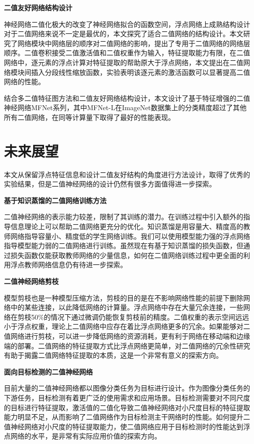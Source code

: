 \textbf{二值友好网络结构设计}

神经网络二值化极大的改变了神经网络拟合的函数空间，浮点网络上成熟结构设计对于二值网络来说不一定是最优的，本文探究了适合二值网络的结构设计。本文研究了网络模块中网络层的顺序对二值网络的影响，提出了专用于二值网络的网络层顺序。二值卷积接受二值激活值和二值权重作为输入，特征提取能力有限，在二值网络中，逐元素的浮点计算对特征提取的帮助原大于浮点网络，本文提出在二值网络模块间插入分段线性缩放函数，实验表明该逐元素的激活函数可以显著提高二值网络的性能。

结合多二值特征图方法和二值友好网络结构设计，本文设计了基于特征增强的二值神经网络MFNet系列，其中MFNet-L在ImageNet数据集上的分类精度超过了其他所有二值网络，在同等计算量下取得了最好的性能表现。

\section{未来展望}

本文从保留浮点特征信息和设计二值友好结构的角度进行方法设计，取得了优秀的实验结果，但是二值神经网络的设计仍然有很多方面值得进一步探索。

\textbf{基于知识蒸馏的二值网络训练方法}

二值神经网络的表示能力较差，限制了其训练的潜力。在训练过程中引入额外的指导信息理论上可以帮助二值网络更充分的优化。知识蒸馏是用容量大、精度高的教师网络指导容量小、精度低的学生网络训练。我们可以使用模型能力强的浮点网络指导模型能力弱的二值网络进行训练。虽然现在有基于知识蒸馏的损失函数，但通过损失函数仅能获取教师网络的少量信息，如何在二值网络训练过程中更全面的利用浮点教师网络信息仍有待进一步探索。

\textbf{二值神经网络剪枝}

模型剪枝也是一种模型压缩方法，剪枝的目的是在不影响网络性能的前提下删除网络中的某些连接，以此降低网络的计算量。浮点网络中存在大量冗余连接，一些网络在剪枝50\%的情况下通过微调仍能恢复剪枝前的精度。二值权重的表示空间远远小于浮点权重，理论上二值网络中应存在着比浮点网络更多的冗余。如果能够对二值网络进行剪枝，可以进一步降低网络的资源消耗，更有利于网络在移动端和边缘端的部署。二值网络的特征提取方式比浮点网络更简单，对二值网络的冗余性研究有助于揭露二值网络特征提取的本质，这是一个非常有意义的探索方向。

\textbf{面向目标检测的二值神经网络}

目前大量的二值神经网络都以图像分类任务为目标进行设计。作为图像分类任务的下游任务，目标检测有着更广泛的使用需求和应用场景。目标检测需要对不同尺度的目标进行特征提取，激活值的二值化导致二值神经网络对小尺度目标的特征提取能力明显不足，从而影响了二值网络作为目标检测主干网络时的性能。如何提升二值神经网络对小尺度的特征提取能力，使二值网络应用于目标检测时的性能达到浮点网络的水平，是非常有实际应用价值的探索方向。
